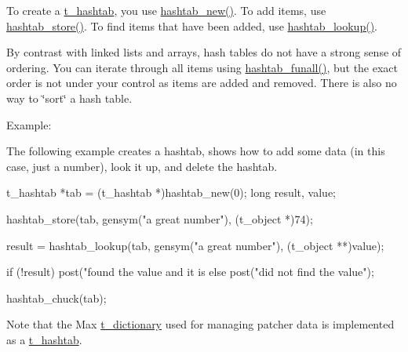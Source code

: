 To create a \hyperlink{structt__hashtab}{t\_\-hashtab}, you use \hyperlink{group__hashtab_ga70be9bbfb9bd9383824df0832477267f}{hashtab\_\-new()}. To add items, use \hyperlink{group__hashtab_gaa26ebe9ba21e84dd0dbb8d5aed12e5a1}{hashtab\_\-store()}. To find items that have been added, use \hyperlink{group__hashtab_gadb206ea811204926bdbf1aa00ca679dc}{hashtab\_\-lookup()}.

By contrast with linked lists and arrays, hash tables do not have a strong sense of ordering. You can iterate through all items using \hyperlink{group__hashtab_ga37e7b5c20c9fc69e9435f788f35335dc}{hashtab\_\-funall()}, but the exact order is not under your control as items are added and removed. There is also no way to \char`\"{}sort\char`\"{} a hash table.

Example:

The following example creates a hashtab, shows how to add some data (in this case, just a number), look it up, and delete the hashtab. 
\begin{DoxyCode}
    t_hashtab *tab = (t_hashtab *)hashtab_new(0);
    long result, value;

    hashtab_store(tab, gensym("a great number"), (t_object *)74);

    result = hashtab_lookup(tab, gensym("a great number"), (t_object **)value);

    if (!result)
        post("found the value and it is %
    else
        post("did not find the value");

    hashtab_chuck(tab);
\end{DoxyCode}


Note that the Max \hyperlink{structt__dictionary}{t\_\-dictionary} used for managing patcher data is implemented as a \hyperlink{structt__hashtab}{t\_\-hashtab}. 